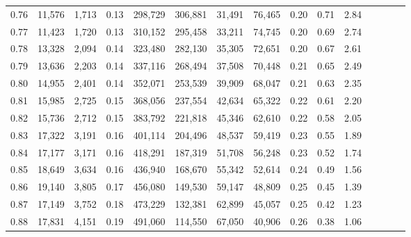 \begin{tabular}{rrrcrrrrrrrrrrr}
0.76 &  11,576 &  1,713 &                                       0.13 &  298,729 &  306,881 &   31,491 &   76,465 &  0.20 &  0.71 &                         2.84 \\
0.77 &  11,423 &  1,720 &                                       0.13 &  310,152 &  295,458 &   33,211 &   74,745 &  0.20 &  0.69 &                         2.74 \\
0.78 &  13,328 &  2,094 &                                       0.14 &  323,480 &  282,130 &   35,305 &   72,651 &  0.20 &  0.67 &                         2.61 \\
0.79 &  13,636 &  2,203 &                                       0.14 &  337,116 &  268,494 &   37,508 &   70,448 &  0.21 &  0.65 &                         2.49 \\
0.80 &  14,955 &  2,401 &                                       0.14 &  352,071 &  253,539 &   39,909 &   68,047 &  0.21 &  0.63 &                         2.35 \\
0.81 &  15,985 &  2,725 &                                       0.15 &  368,056 &  237,554 &   42,634 &   65,322 &  0.22 &  0.61 &                         2.20 \\
0.82 &  15,736 &  2,712 &                                       0.15 &  383,792 &  221,818 &   45,346 &   62,610 &  0.22 &  0.58 &                         2.05 \\
0.83 &  17,322 &  3,191 &                                       0.16 &  401,114 &  204,496 &   48,537 &   59,419 &  0.23 &  0.55 &                         1.89 \\
0.84 &  17,177 &  3,171 &                                       0.16 &  418,291 &  187,319 &   51,708 &   56,248 &  0.23 &  0.52 &                         1.74 \\
0.85 &  18,649 &  3,634 &                                       0.16 &  436,940 &  168,670 &   55,342 &   52,614 &  0.24 &  0.49 &                         1.56 \\
0.86 &  19,140 &  3,805 &                                       0.17 &  456,080 &  149,530 &   59,147 &   48,809 &  0.25 &  0.45 &                         1.39 \\
0.87 &  17,149 &  3,752 &                                       0.18 &  473,229 &  132,381 &   62,899 &   45,057 &  0.25 &  0.42 &                         1.23 \\
0.88 &  17,831 &  4,151 &                                       0.19 &  491,060 &  114,550 &   67,050 &   40,906 &  0.26 &  0.38 &                         1.06 \\

\end{tabular}
